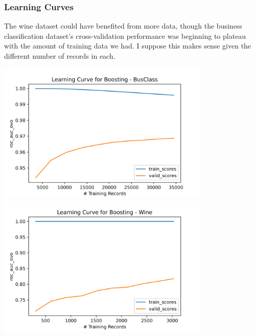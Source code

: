 \documentclass[
	letterpaper, %
]{jdf}
\begin{document}
\subsubsection{Learning Curves}
The wine dataset could have benefited from more data, though the business classification dataset's cross-validation performance was beginning to plateau with the amount of training data we had. I suppose this makes sense given the different number of records in each.

\includegraphics[width=4in]{Figures/BusClass-0920/GBM/learn_curve.png}
\includegraphics[width=4in]{Figures/Wine-0921/GBM/learn_curve.png}
\end{document}
